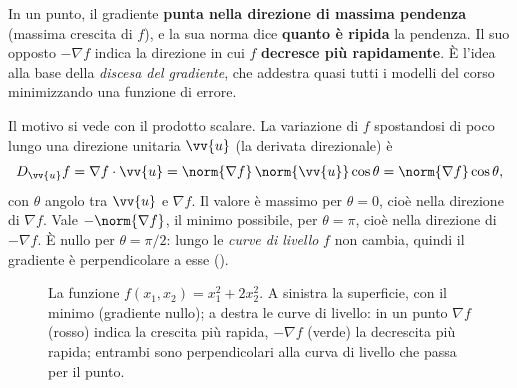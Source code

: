 \begin{idea}
In un punto, il gradiente \textbf{punta nella direzione di massima pendenza} (massima crescita di $f$), e la sua
norma dice \textbf{quanto è ripida} la pendenza. Il suo opposto $-\nabla f$ indica la direzione in cui $f$
\textbf{decresce più rapidamente}. È l'idea alla base della \emph{discesa del gradiente}, che addestra quasi
tutti i modelli del corso minimizzando una funzione di errore.
\end{idea}

Il motivo si vede con il prodotto scalare. La variazione di $f$ spostandosi di poco lungo una direzione
unitaria $\vv{u}$ (la derivata direzionale) è
\[
D_{\vv{u}}f = \nabla f\cdot\vv{u} = \norm{\nabla f}\,\norm{\vv{u}}\cos\theta = \norm{\nabla f}\cos\theta ,
\]
con $\theta$ angolo tra $\vv{u}$ e $\nabla f$. Il valore è massimo per $\theta = 0$, cioè nella direzione di
$\nabla f$. Vale $-\norm{\nabla f}$, il minimo possibile, per $\theta=\pi$, cioè nella direzione di $-\nabla f$.
È nullo per $\theta=\pi/2$: lungo le \emph{curve di livello} $f$ non cambia, quindi il gradiente è
perpendicolare a esse ().

\begin{figure}[t]
\centering
{}\hspace{0.6cm}
\caption{La funzione $f(x_1,x_2)=x_1^2+2x_2^2$. A sinistra la superficie, con il minimo (gradiente nullo); a
destra le curve di livello: in un punto $\nabla f$ (rosso) indica la crescita più rapida, $-\nabla f$ (verde) la
decrescita più rapida; entrambi sono perpendicolari alla curva di livello che passa per il punto.}
\label{fig:gradiente}
\end{figure}

